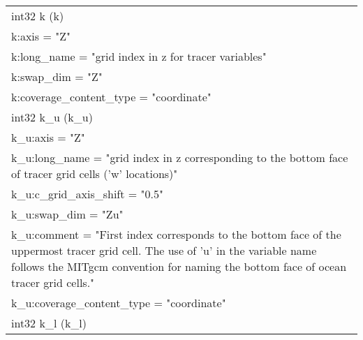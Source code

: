 \begin{longtable}{|p{\textwidth}|}
\rowcolor{Apricot}\hspace{0.5cm}int32 k (k)\\
\rowcolor{Apricot}\hspace{0.5cm}\hspace{0.5cm}k:axis = "Z"\\
\rowcolor{Apricot}\hspace{0.5cm}\hspace{0.5cm}k:long\_name = "grid index in z for tracer variables"\\
\rowcolor{Apricot}\hspace{0.5cm}\hspace{0.5cm}k:swap\_dim = "Z"\\
\rowcolor{Apricot}\hspace{0.5cm}\hspace{0.5cm}k:coverage\_content\_type = "coordinate"\\
\rowcolor{Apricot}\hspace{0.5cm}int32 k\_u (k\_u)\\
\rowcolor{Apricot}\hspace{0.5cm}\hspace{0.5cm}k\_u:axis = "Z"\\
\rowcolor{Apricot}\hspace{0.5cm}\hspace{0.5cm}k\_u:long\_name = "grid index in z corresponding to the bottom face of tracer grid cells ('w' locations)"\\
\rowcolor{Apricot}\hspace{0.5cm}\hspace{0.5cm}k\_u:c\_grid\_axis\_shift = "0.5"\\
\rowcolor{Apricot}\hspace{0.5cm}\hspace{0.5cm}k\_u:swap\_dim = "Zu"\\
\rowcolor{Apricot}\hspace{0.5cm}\hspace{0.5cm}k\_u:comment = "First index corresponds to the bottom face of the uppermost tracer grid cell. The use of 'u' in the variable name follows the MITgcm convention for naming the bottom face of ocean tracer grid cells."\\
\rowcolor{Apricot}\hspace{0.5cm}\hspace{0.5cm}k\_u:coverage\_content\_type = "coordinate"\\
\rowcolor{Apricot}\hspace{0.5cm}int32 k\_l (k\_l)\\

\end{longtable}
